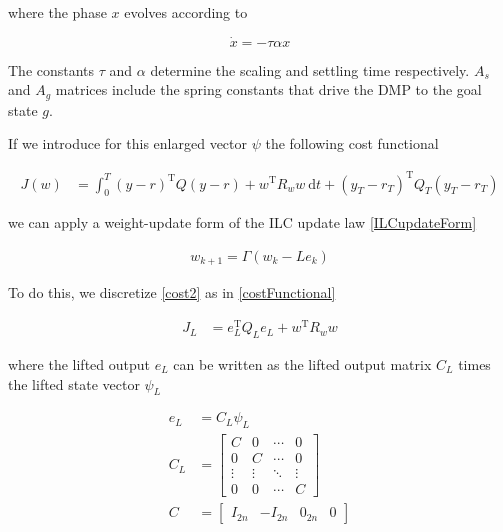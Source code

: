 \documentclass[10pt,a4paper]{article}
\newcommand{\state}{y} %
\newcommand{\error}{e} %
\newcommand{\traj}{r} %
\newcommand{\fullvec}{\psi} %
\newcommand{\phase}{x} %
\newcommand{\weights}{w} %
\newcommand{\qmatrix}{\Gamma} %
\newcommand{\lmatrix}{L} %
\newcommand{\ValueFunction}{J}
\begin{document}
where the phase $\phase$ evolves according to

\begin{equation}
\dot{\phase} = -\tau\alpha\phase
\label{phase}
\end{equation}

The constants $\tau$ and $\alpha$ determine the scaling and settling time respectively. $A_s$ and $A_g$ matrices include the spring constants that drive the DMP to the goal state $g$.

If we introduce for this enlarged vector $\fullvec$ the following cost functional

\begin{equation}
\begin{aligned}
J(\weights) &= \int_{0}^{T} (\state - \traj)^{\mathrm{T}}Q(\state - \traj) + \weights^{\mathrm{T}}R_w\weights \ \mathrm{d}t +  (\state_T-\traj_T)^{\mathrm{T}}Q_{T}(\state_T-\traj_T) 
\end{aligned}
\label{cost2}
\end{equation}

we can apply a weight-update form of the ILC update law \eqref{ILCupdateForm}

\begin{equation}
\begin{aligned}
\weights_{k+1} = \qmatrix(\weights_{k} - \lmatrix\error_{k})
\end{aligned}
\label{ILCupdateFormWeights}
\end{equation}

To do this, we discretize \eqref{cost2} as in \eqref{costFunctional}

\begin{equation}
\begin{aligned}
\ValueFunction_L &= \error_L^{\mathrm{T}}Q_L\error_L + \weights^{\mathrm{T}}R_w\weights
\end{aligned}
\label{costFunctionalWeights}
\end{equation}

where the lifted output $\error_L$ can be written as the lifted output matrix $C_L$ times the lifted state vector $\fullvec_L$

\begin{equation}
\begin{aligned}
\error_L &= C_L \fullvec_L \\
C_L &= 
  \begin{bmatrix}
   C & 0 & \cdots & 0 \\
   0 & C & \cdots & 0 \\
   \vdots  & \vdots  & \ddots & \vdots  \\
   0 & 0 & \cdots & C
  \end{bmatrix} \\
C &= \begin{bmatrix}
  I_{2n} & -I_{2n} & 0_{2n} & 0
 \end{bmatrix}
\end{aligned}
\label{outputWeights}
\end{equation}
\end{document}
